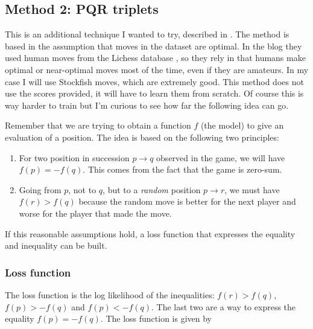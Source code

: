 \subsection{Method 2: PQR triplets}

This is an additional technique I wanted to try, described in \cite{dlchess:2014}. The method is based in the assumption that moves in the dataset are optimal. In the blog they used human moves from the Lichess database \cite{lichessdb}, so they rely in that humans make optimal or near-optimal moves most of the time, even if they are amateurs. In my case I will use Stockfish moves, which are extremely good. This method does not use the scores provided, it will have to learn them from scratch. Of course this is way harder to train but I'm curious to see how far the following idea can go.

Remember that we are trying to obtain a function $f$ (the model) to give an evaluation of a position. The idea is based on the following two principles:

\begin{enumerate}
\item For two position in succession $p \rightarrow q$ observed in the game, we will have $f(p)=-f(q)$. This comes from the fact that the game is zero-sum.
\item Going from $p$, not to $q$, but to a \textit{random} position $p \rightarrow r$, we must have $f(r) > f(q)$ because the random move is better for the next player and worse for the player that made the move.
\end{enumerate}

If this reasonable assumptions hold, a loss function that expresses the equality and inequality can be built.


\subsubsection{Loss function}

The loss function is the log likelihood of the inequalities: $f(r) > f(q)$, $f(p) > - f(q)$ and $f(p) < -f(q)$. The last two are a way to express the equality $f(p)=-f(q)$. The loss function is given by


